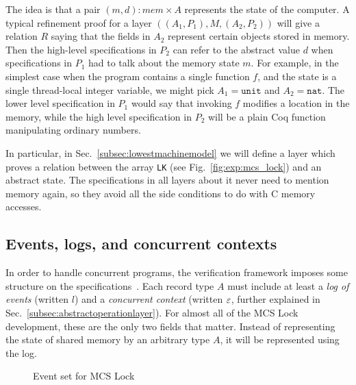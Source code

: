 The idea is that a pair $(m,d) : \mathit{mem} \times A$ represents the
state of the computer. A typical refinement proof for a layer
$((A_1,P_1),M,(A_2,P_2))$  will give a relation
$R$ saying that the fields in $A_2$ represent certain objects stored
in memory. Then the high-level specifications in $P_2$ can refer to
the abstract value $d$ when specifications in $P_1$ had to talk about
the memory state $m$.
For example, in the simplest case when the
program contains a single function $f$, and the state is a single
thread-local integer variable, we
might pick $A_1 = \mathrm{\texttt{unit}}$ and $A_2 = \mathrm{\texttt{nat}}$.
The lower level specification in $P_1$ would say that invoking $f$
modifies a location in the memory, while the high level specification in $P_2$
will be a plain Coq function manipulating ordinary numbers.

In particular, in Sec.~\ref{subsec:lowestmachinemodel} we will
define a layer which proves a relation between the array \lstinline$LK$ (see
Fig.~\ref{fig:exp:mcs_lock}) and an abstract state. The
specifications in all layers about it never need to mention memory
again, so they avoid all the side conditions to do with C memory accesses.

\subsection{Events, logs, and concurrent contexts}
\label{subsec:eventlogandoracle}

In order to handle concurrent programs, the verification framework
imposes some structure on the specifications~\cite{ccal16}.  Each
record type $A$ must include at least a \emph{log of events} (written
$l$) and a \emph{concurrent context} (written $\oracle$, further
explained in Sec.~\ref{subsec:abstractoperationlayer}). For almost
all of the MCS Lock development, these are the only two fields that
matter. Instead of representing the state of shared
memory by an arbitrary type $A$, it will be represented using the log.

\begin{figure}
\begin{minipage}{\linewidth}

\end{minipage}
\caption{Event set for MCS Lock}
\label{fig:lock_event_type}
\end{figure}

